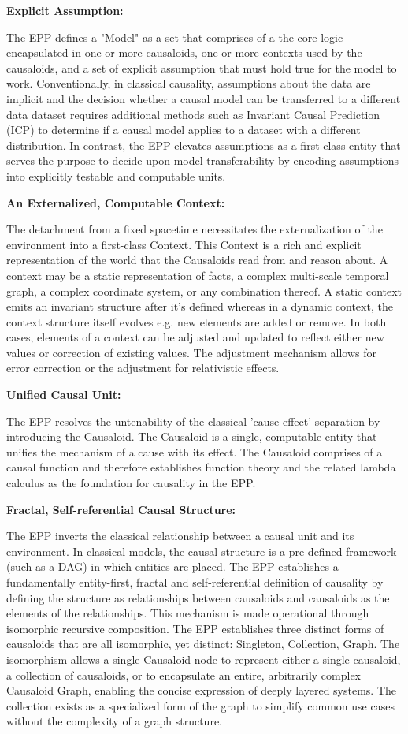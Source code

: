 \textbf{Explicit Assumption:}

The EPP defines a "Model" as a set that comprises of a the core logic encapsulated in one or more causaloids, one or more contexts used by the causaloids, and a set of explicit assumption that must hold true for the model to work. Conventionally, in classical causality, assumptions about the data are  implicit and the decision whether a causal model can be transferred to a different data dataset requires additional methods such as Invariant Causal Prediction (ICP) to determine if a causal model applies to a dataset with a different distribution. In contrast, the EPP elevates assumptions as a first class entity that serves the purpose to decide upon model transferability by encoding assumptions into explicitly testable and computable units. 

\textbf{An Externalized, Computable Context:} 

The detachment from a fixed spacetime necessitates the externalization of the environment into a first-class Context. This Context is a rich and explicit representation of the world that the Causaloids read from and reason about. A context may be a static representation of facts, a complex multi-scale temporal graph, a complex coordinate system, or any combination thereof. A static context emits an invariant structure after it’s defined whereas in a dynamic context, the context structure itself evolves e.g. new elements are added or remove. In both cases, elements of a context can be adjusted and updated to reflect either new values or correction of existing values. The adjustment mechanism allows for error correction or the adjustment for relativistic effects.   

 \textbf{Unified Causal Unit:} 
 
 The EPP resolves the untenability of the classical 'cause-effect' separation by introducing the Causaloid. The Causaloid is a single, computable entity that unifies the mechanism of a cause with its effect. The Causaloid comprises of a causal function and therefore establishes function theory and the related lambda calculus as the foundation for causality in the EPP. 

\textbf{Fractal, Self-referential Causal Structure:} 

The EPP inverts the classical relationship between a causal unit and its environment. In classical models, the causal structure is a pre-defined framework (such as a DAG) in which entities are placed. The EPP establishes a fundamentally entity-first, fractal and self-referential definition of causality by defining the structure as relationships between causaloids and causaloids as the elements of the relationships. This mechanism is made operational through isomorphic recursive composition. The EPP establishes three distinct forms of causaloids that are all isomorphic, yet distinct: Singleton, Collection, Graph.  The isomorphism allows a single Causaloid node to represent either a single causaloid, a collection of causaloids, or to encapsulate an entire, arbitrarily complex Causaloid Graph, enabling the concise expression of deeply layered systems. The collection exists as a specialized form of the graph to simplify common use cases without the complexity of a graph structure. 


